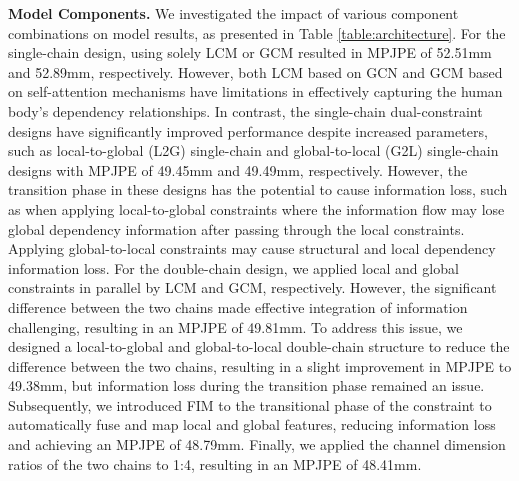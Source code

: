 \documentclass[journal]{IEEEtran}
\begin{document}
{\bf{Model Components.}} We investigated the impact of various component combinations on model results, as presented in Table \ref{table:architecture}. For the single-chain design, using solely LCM or GCM resulted in MPJPE of 52.51mm and 52.89mm, respectively. However, both LCM based on GCN and GCM based on self-attention mechanisms have limitations in effectively capturing the human body's dependency relationships. In contrast, the single-chain dual-constraint designs have significantly improved performance despite increased parameters, such as local-to-global (L2G) single-chain and global-to-local (G2L) single-chain designs with MPJPE of 49.45mm and 49.49mm, respectively. However, the transition phase in these designs has the potential to cause information loss, such as when applying local-to-global constraints where the information flow may lose global dependency information after passing through the local constraints. Applying global-to-local constraints may cause structural and local dependency information loss. For the double-chain design, we applied local and global constraints in parallel by LCM and GCM, respectively. However, the significant difference between the two chains made effective integration of information challenging, resulting in an MPJPE of 49.81mm. To address this issue, we designed a local-to-global and global-to-local double-chain structure to reduce the difference between the two chains, resulting in a slight improvement in MPJPE to 49.38mm, but information loss during the transition phase remained an issue. Subsequently, we introduced FIM to the transitional phase of the constraint to automatically fuse and map local and global features, reducing information loss and achieving an MPJPE of 48.79mm. Finally, we applied the channel dimension ratios of the two chains to 1:4, resulting in an MPJPE of 48.41mm. 
\end{document}

